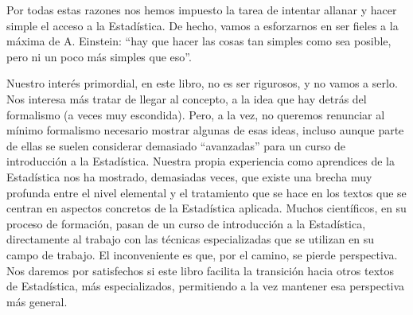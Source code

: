 Por todas estas razones nos hemos impuesto la tarea de intentar allanar y hacer simple el acceso a la Estadística. De hecho, vamos a esforzarnos en ser fieles a la máxima de A. Einstein: ``hay que hacer las cosas tan simples como sea posible, pero ni un poco más simples que eso''.

Nuestro interés primordial, en este libro, no es ser rigurosos, y no vamos a serlo. Nos interesa más tratar de llegar al concepto, a la idea que hay detrás del formalismo (a veces muy escondida). Pero, a la vez, no queremos renunciar al mínimo formalismo necesario mostrar algunas de esas ideas, incluso aunque parte de ellas se suelen considerar demasiado ``avanzadas'' para un curso de introducción a la Estadística. Nuestra propia experiencia como aprendices de la Estadística nos ha mostrado, demasiadas veces, que existe una brecha muy profunda entre el nivel elemental y el tratamiento que se hace en los textos que se centran en aspectos concretos de la Estadística aplicada.  Muchos científicos, en su proceso de formación,  pasan de un curso de introducción a la Estadística, directamente al trabajo con las técnicas especializadas que se utilizan en su campo de trabajo. El inconveniente es que, por el camino, se pierde perspectiva. Nos daremos por satisfechos si este libro facilita la transición hacia otros textos de Estadística, más especializados, permitiendo a la vez mantener esa perspectiva más general.




%
%
%

